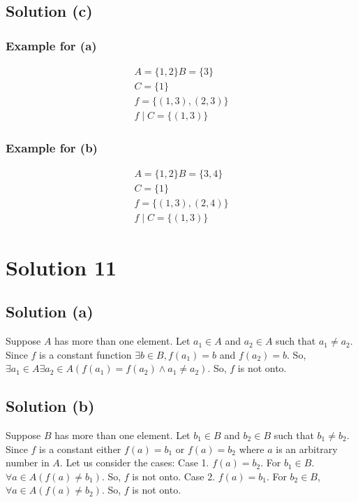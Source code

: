 \documentclass{article}
\begin{document}
\subsection{Solution (c)}
\subsubsection{Example for (a)}
\begin{align*}
  A = \{1,2\}
  B = \{3\} \\
  C = \{1\} \\
  f = \{(1,3), (2,3)\} \\
  f \mid C = \{(1,3)\} 
\end{align*}

\subsubsection{Example for (b)}
\begin{align*}
  A = \{1,2\}
  B = \{3,4\} \\
  C = \{1\} \\
  f = \{(1,3), (2,4)\} \\
  f \mid C = \{(1,3)\} 
\end{align*}

\section{Solution 11}
\subsection{Solution (a)}
Suppose $A$ has more than one element. Let $a_1 \in A$ and $a_2 \in A$
such that $a_1 \neq a_2$. Since $f$ is a constant function $\exists b
\in B, f(a_1) = b$ and $f(a_2) = b$. So, $\exists a_1 \in A \exists
a_2 \in A(f(a_1) = f(a_2) \land a_1 \neq a_2)$. So, $f$ is not onto.

\subsection{Solution (b)}
Suppose $B$ has more than one element. Let $b_1 \in B$ and $b_2 \in B$
such that $b_1 \neq b_2$. Since $f$ is a constant either $f(a) = b_1$
or $f(a) = b_2$ where $a$ is an arbitrary number in $A$. Let us
consider the cases:
Case 1. $f(a) = b_2$. For $b_1 \in B$. $\forall a \in A(f(a) \neq
b_1)$. So, $f$ is not onto.
Case 2. $f(a) = b_1$. For $b_2 \in B$, $\forall a \in A(f(a) \neq
b_2)$. So, $f$ is not onto.
\end{document}

